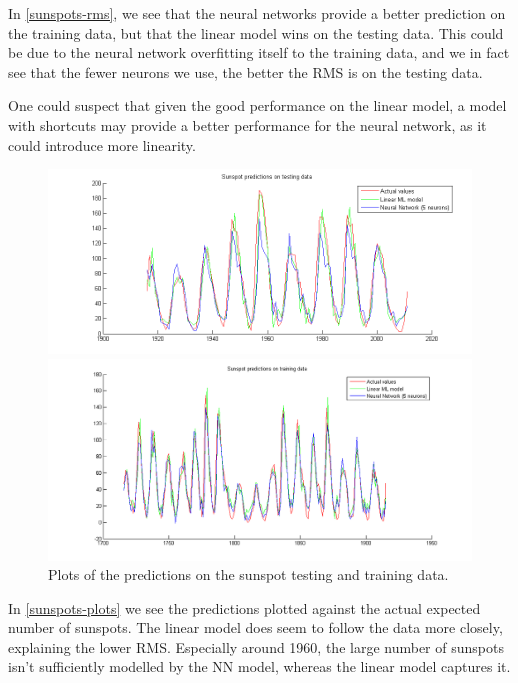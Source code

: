 \documentclass[11pt,a4paper]{article}
\begin{document}
In \autoref{sunspots-rms}, we see that the neural networks provide a better
prediction on the training data, but that the linear model wins on the testing
data. This could be due to the neural network overfitting itself to the
training data, and we in fact see that the fewer neurons we use, the better
the RMS is on the testing data.

One could suspect that given the good performance on the linear model, a model
with shortcuts may provide a better performance for the neural network, as it
could introduce more linearity.

\begin{figure}[h!]
    \includegraphics[width=\textwidth]{images/sunspots-testing.png}

    \includegraphics[width=\textwidth]{images/sunspots-training.png}
    \caption{Plots of the predictions on the sunspot testing and training data.}
    \label{sunspots-plots}
\end{figure}

In \autoref{sunspots-plots} we see the predictions plotted against the actual
expected number of sunspots. The linear model does seem to follow the data
more closely, explaining the lower RMS. Especially around 1960, the large
number of sunspots isn't sufficiently modelled by the NN model, whereas the
linear model captures it.
\end{document}
